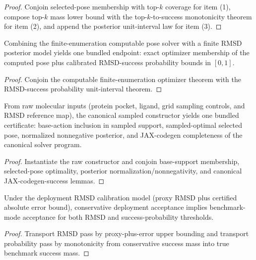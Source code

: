 \begin{proof}
Conjoin selected-pose membership with top-$k$ coverage for item (1), compose top-$k$ mass lower bound with the top-$k$-to-success monotonicity theorem for item (2), and append the posterior unit-interval law for item (3).
\end{proof}

\begin{theorem}\label{thm:joint-computable-pose-rmsd-probability-bundle}
Combining the finite-enumeration computable pose solver with a finite RMSD posterior model yields one bundled endpoint: exact optimizer membership of the computed pose plus calibrated RMSD-success probability bounds in $[0,1]$.
\end{theorem}

\begin{proof}
Conjoin the computable finite-enumeration optimizer theorem with the RMSD-success probability unit-interval theorem.
\end{proof}

\begin{theorem}\label{thm:raw-pocket-ligand-constructor-posterior-bundle}
From raw molecular inputs (protein pocket, ligand, grid sampling controls, and RMSD reference map), the canonical sampled constructor yields one bundled certificate: base-action inclusion in sampled support, sampled-optimal selected pose, normalized nonnegative posterior, and JAX-codegen completeness of the canonical solver program.
\end{theorem}

\begin{proof}
Instantiate the raw constructor and conjoin base-support membership, selected-pose optimality, posterior normalization/nonnegativity, and canonical JAX-codegen-success lemmas.
\end{proof}

\begin{theorem}\label{thm:deployment-contract-implies-benchmark-contract}
Under the deployment RMSD calibration model (proxy RMSD plus certified absolute error bound), conservative deployment acceptance implies benchmark-mode acceptance for both RMSD and success-probability thresholds.
\end{theorem}

\begin{proof}
Transport RMSD pass by proxy-plus-error upper bounding and transport probability pass by monotonicity from conservative success mass into true benchmark success mass.
\end{proof}

